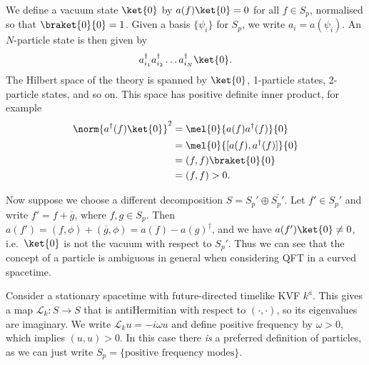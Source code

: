 \documentclass{jknotes}
\begin{document}
We define a vacuum state \(\ket{0}\) by \(a(f)\ket{0}=0\) for all \(f\in S_p\), normalised so that \(\braket{0}{0}=1\). Given a basis \(\{\psi_i\}\) for \(S_p\), we write \(a_i=a(\psi_i)\). An \(N\)-particle state is then given by
\begin{equation}
    a_{i_1}^\dagger a_{i_2}^\dagger \dots a_{i_N}^\dagger \ket{0}.
\end{equation}
The Hilbert space of the theory is spanned by \(\ket{0}\), 1-particle states, 2-particle states, and so on. This space has positive definite inner product, for example
\begin{align}
    \norm{a^\dagger(f)\ket{0}}^2 &= \mel{0}{a(f)a^\dagger(f)}{0} \\
                                 &= \mel{0}{[a(f),a^\dagger(f)]}{0} \\
                                 &= (f,f)\braket{0}{0} \\
                                 &= (f,f) > 0.
\end{align}

Now suppose we choose a different decomposition \(S = S_p' \oplus \overline{S_p'}\). Let \(f'\in S_p'\) and write \(f' = f + \overline{g}\), where \(f,g\in S_p\). Then \(a(f') = (f,\phi) + (\overline{g},\phi) = a(f)-a(g)^\dagger\), and we have \(a(f')\ket{0}\ne0\), i.e.\ \(\ket{0}\) is not the vacuum with respect to \(S_p'\). Thus we can see that the concept of a particle is ambiguous in general when considering QFT in a curved spacetime.

Consider a stationary spacetime with future-directed timelike KVF \(k^a\). This gives a map \(\mathcal{L}_k:S\to S\) that is antiHermitian with respect to \((\cdot,\cdot)\), so its eigenvalues are imaginary. We write \(\mathcal{L}_ku=-i\omega u\) and define positive frequency by \(\omega>0\), which implies \((u,u)>0\). In this case there \emph{is} a preferred definition of particles, as we can just write \(S_p = \{\text{positive frequency modes}\}\).
\end{document}
